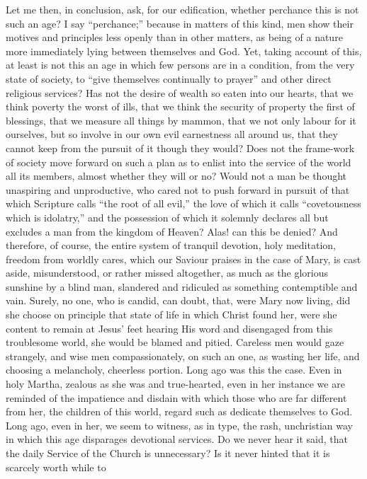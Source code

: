 Let me then, in conclusion, ask, for our edification, whether
perchance this is not such an age? I say ``perchance;''
because in matters of this kind, men show their motives and principles
less openly than in other matters, as being of a nature more
immediately lying between themselves and God. Yet, taking account of
this, at least is not this an age in which few persons are in a
condition, from the very state of society, to ``give themselves
continually to prayer'' and other direct religious services? Has
not the desire of wealth so eaten into our hearts, that we think
poverty the worst of ills, that we think the security of property the
first of blessings, that we measure all things by mammon, that we not
only labour for it ourselves, but so involve in our own evil
earnestness all around us, that they cannot keep from the pursuit of
it though they would? Does not the frame-work of society move forward
on such a plan as to enlist into the service of the world all its
members, almost whether they will or no? Would not a man be thought
unaspiring and unproductive, who cared not to push forward in pursuit
of that which Scripture calls ``the root of all evil,'' the
love of which it calls ``covetousness which is idolatry,'' and
the possession of which it solemnly declares all but excludes a man
from the kingdom of Heaven? Alas! can this be denied? And therefore,
of course, the entire system of tranquil devotion, holy meditation,
freedom from worldly cares, which our Saviour praises in the case of
Mary, is cast aside, misunderstood, or rather missed altogether, as
much as the glorious sunshine by a blind man, slandered and ridiculed
as something contemptible and vain. Surely, no one, who is candid, can
doubt, that, were Mary now living, did she choose on principle that
state of life in which Christ found her, were she content to remain at
Jesus' feet hearing His word and disengaged from this troublesome
world, she would be blamed and pitied. Careless men would gaze
strangely, and wise men compassionately, on such an one, as wasting
her life, and choosing a melancholy, cheerless portion. Long ago was
this the case. Even in holy Martha, zealous as she was and
true-hearted, even in her instance we are reminded of the impatience
and disdain with which those who are far different from her, the
children of this world, regard such as dedicate themselves to God.
Long ago, even in her, we seem to witness, as in type, the rash,
unchristian way in which this age disparages devotional services. Do
we never hear it said, that the daily Service of the Church is
unnecessary? Is it never hinted that it is scarcely worth while to
